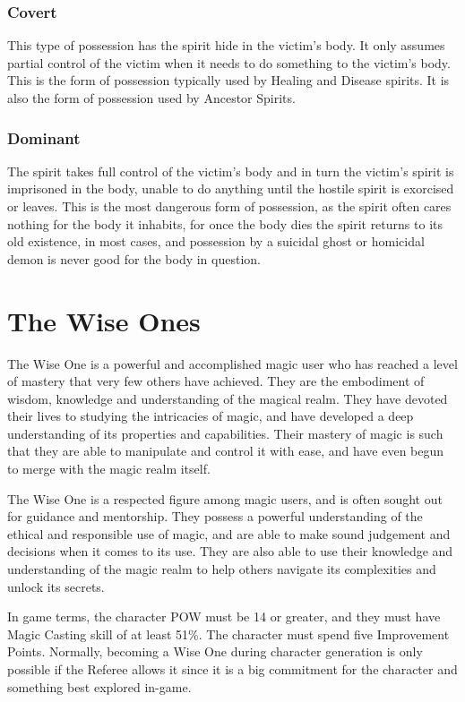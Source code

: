 \subsubsection{Covert}
This type of possession has the spirit hide in the victim’s body. It only assumes partial control of the victim when it needs to do something to the victim’s body. This is the form of possession typically used by Healing and Disease spirits. It is also the form of possession used by Ancestor Spirits.

\subsubsection{Dominant}
The spirit takes full control of the victim’s body and in turn the victim’s spirit is imprisoned in the body, unable to do anything until the hostile spirit is exorcised or leaves. This is the most dangerous form of possession, as the spirit often cares nothing for the body it inhabits, for once the body dies the spirit returns to its old existence, in most cases, and possession by a suicidal ghost or homicidal demon is never good for the body in question.


\section{The Wise Ones}
The Wise One is a powerful and accomplished magic user who has reached a level of mastery that very few others have achieved. They are the embodiment of wisdom, knowledge and understanding of the magical realm. They have devoted their lives to studying the intricacies of magic, and have developed a deep understanding of its properties and capabilities. Their mastery of magic is such that they are able to manipulate and control it with ease, and have even begun to merge with the magic realm itself.

The Wise One is a respected figure among magic users, and is often sought out for guidance and mentorship. They possess a powerful understanding of the ethical and responsible use of magic, and are able to make sound judgement and decisions when it comes to its use. They are also able to use their knowledge and understanding of the magic realm to help others navigate its complexities and unlock its secrets.

In game terms, the character POW must be 14 or greater, and they must have Magic Casting skill of at least 51\%. The character must spend five Improvement Points. Normally, becoming a Wise One during character generation is only possible if the Referee allows it since it is a big commitment for the character and something best explored in-game.

